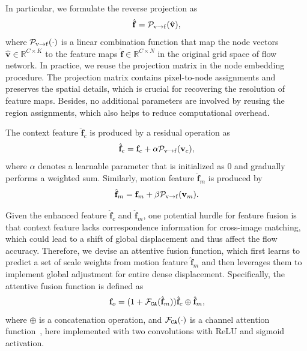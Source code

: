 \documentclass[letterpaper]{article} %
\begin{document}
In particular, we formulate the reverse projection as
\begin{equation}
\hat{\mathbf f} = {\cal P}_{{\mathrm v}\rightarrow {\mathrm f}}(\hat{\mathbf v}),
\end{equation}
where ${\cal P}_{{\mathrm v}\rightarrow {\mathrm f}}(\cdot)$ is a linear combination function that map the node vectors $\hat{\mathbf v} \in \mathbb{R}^{C \times K}$ to the feature maps $\hat{\mathbf f} \in \mathbb{R}^{C \times N}$ in the original grid space of flow network. In practice, we reuse the projection matrix in the node embedding procedure. The projection matrix contains pixel-to-node assignments and preserves the spatial details, which is crucial for recovering the resolution of feature maps. Besides, no additional parameters are involved by reusing the region assignments, which also helps to reduce computational overhead.

The context feature $\hat{\mathbf f}_c$ is produced by a residual operation as
\begin{equation}
\hat{\mathbf f}_c = {\mathbf f}_c + \alpha {\cal P}_{{\mathrm v}\rightarrow {\mathrm f}}({\mathbf v}_c),
\end{equation}
where $\alpha$ denotes a learnable parameter that is initialized as $0$ and gradually performs a weighted sum. Similarly, motion feature $\hat{\mathbf f}_m$ is produced by
\begin{equation}
\hat{\mathbf f}_m = {\mathbf f}_m + \beta {\cal P}_{{\mathrm v}\rightarrow {\mathrm f}}({\mathbf v}_m).
\end{equation}

Given the enhanced feature $\hat{\mathbf f}_c$ and $\hat{\mathbf f}_m$, one potential hurdle for feature fusion is that context feature lacks correspondence information for cross-image matching, which could lead to a shift of global displacement and thus affect the flow accuracy. Therefore, we devise an attentive fusion function, which first learns to predict a set of scale weights from motion feature $\hat{\mathbf f}_m$ and then leverages them to implement global adjustment for entire dense displacement. Specifically, the attentive fusion function is defined as
\begin{equation}
{\mathbf f}_o = (1+{\cal F}_{\tt CA}(\hat{\mathbf f}_m)) \hat{\mathbf f}_c \oplus \hat{\mathbf f}_m,
\end{equation}
where $\oplus$ is a concatenation operation, and ${\cal F}_{\tt CA}(\cdot)$ is a channel attention function~\cite{Hu2020SqueezeandExcitationN}, here implemented with two convolutions with ReLU and sigmoid activation.
\end{document}
